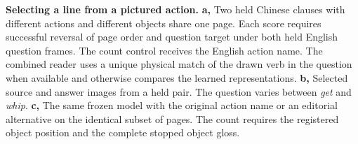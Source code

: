 \textbf{Selecting a line from a pictured action.} \textbf{a,} Two held Chinese clauses with different actions and different objects share one page. Each score requires successful reversal of page order and question target under both held English question frames. The count control receives the English action name. The combined reader uses a unique physical match of the drawn verb in the question when available and otherwise compares the learned representations. \textbf{b,} Selected source and answer images from a held pair. The question varies between \textit{get} and \textit{whip}. \textbf{c,} The same frozen model with the original action name or an editorial alternative on the identical subset of pages. The count requires the registered object position and the complete stopped object gloss.
